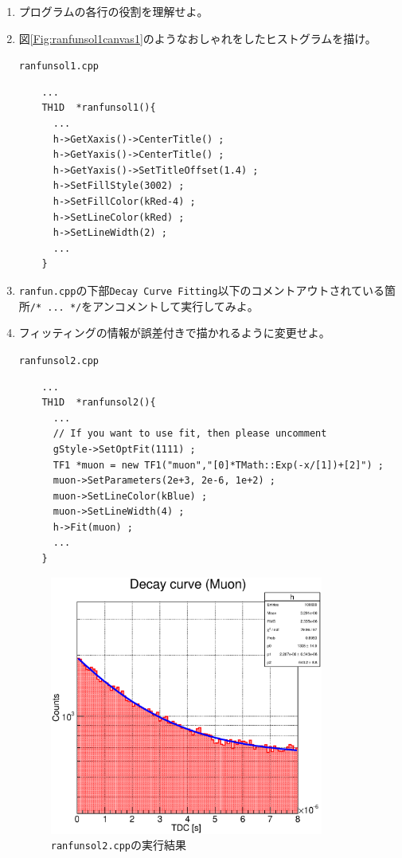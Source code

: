   \begin{enumerate}
   \item プログラムの各行の役割を理解せよ。

   \item 図\ref{Fig:ranfunsol1canvas1}のようなおしゃれをしたヒストグラムを描け。
	 \begin{itembox}{\texttt{ranfunsol1.cpp}}
\begin{verbatim}
	...
	TH1D  *ranfunsol1(){ 
	  ...
	  h->GetXaxis()->CenterTitle() ;
	  h->GetYaxis()->CenterTitle() ;
	  h->GetYaxis()->SetTitleOffset(1.4) ;
	  h->SetFillStyle(3002) ;
	  h->SetFillColor(kRed-4) ;
	  h->SetLineColor(kRed) ;
	  h->SetLineWidth(2) ;
	  ...
	}
\end{verbatim}
	 \end{itembox}

   \item \verb|ranfun.cpp|の下部\verb|Decay Curve Fitting|以下のコメントアウトされている箇所\verb|/* ... */|をアンコメントして実行してみよ。

   \item フィッティングの情報が誤差付きで描かれるように変更せよ。
	 \begin{itembox}{\texttt{ranfunsol2.cpp}}
\begin{verbatim}
	...
	TH1D  *ranfunsol2(){ 
	  ...
	  // If you want to use fit, then please uncomment
	  gStyle->SetOptFit(1111) ;
	  TF1 *muon = new TF1("muon","[0]*TMath::Exp(-x/[1])+[2]") ;
	  muon->SetParameters(2e+3, 2e-6, 1e+2) ;
	  muon->SetLineColor(kBlue) ;
	  muon->SetLineWidth(4) ;
	  h->Fit(muon) ;
	  ...
	}
\end{verbatim}
	 \end{itembox}
	 \begin{figure}[htbp]
	  \begin{center}
	   \includegraphics[width = 90mm]{./picture/ranfunsol2canvas1.eps}
	  \end{center}
	  \caption{\texttt{ranfunsol2.cpp}の実行結果}
	  \label{Fig:ranfunsol2canvas1}
	 \end{figure}

  \end{enumerate}
